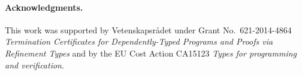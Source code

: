\documentclass[a4paper]{easychair}
\begin{document}
\paragraph*{Acknowledgments.}
This work was supported by
Vetenskapsr\aa{}det under Grant
  No.~621-2014-4864 \emph{Termination Certificates
  for Dependently-Typed Programs and Proofs via Refinement Types}
and by the EU Cost Action CA15123 \emph{Types for programming and verification}.

\begin{footnotesize}




\end{footnotesize}
\end{document}
